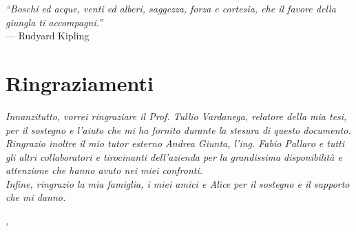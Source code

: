 
\cleardoublepage
{}
{}

\begin{flushright}{ %
	\slshape
	``Boschi ed acque, venti ed alberi, saggezza, forza e cortesia, che il favore della giungla ti accompagni.''} \\
	\medskip
    --- Rudyard Kipling
\end{flushright}


\bigskip

\begingroup
\let\clearpage\relax
\let\cleardoublepage\relax
\let\cleardoublepage\relax

\chapter*{Ringraziamenti}

\noindent \textit{Innanzitutto, vorrei ringraziare il Prof. Tullio Vardanega, relatore della mia tesi, per il sostegno e l'aiuto che mi ha fornito durante la stesura di questo documento.}\\

\noindent \textit{Ringrazio inoltre il mio tutor esterno Andrea Giunta, l'ing. Fabio Pallaro e tutti gli altri collaboratori e tirocinanti dell'azienda per la grandissima disponibilità e attenzione che hanno avuto nei miei confronti.}\\

\noindent \textit{Infine, ringrazio la mia famiglia, i miei amici e Alice per il sostegno e il supporto che mi danno.}\\
\bigskip

\noindent\textit{\myLocation, \myTime}
\hfill \myName

\endgroup
